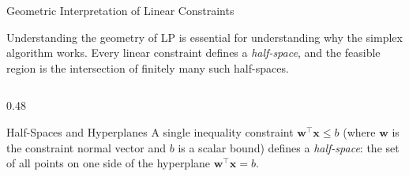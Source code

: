 \documentclass[aspectratio=169,10pt]{beamer}
\newcommand{\xv}{\mathbf{x}}
\newcommand{\wv}{\mathbf{w}}
\begin{document}
\begin{frame}[allowframebreaks]{Geometric Interpretation of Linear Constraints}

Understanding the geometry of LP is essential for understanding why the simplex
algorithm works.  Every linear constraint defines a \emph{half-space}, and the
feasible region is the intersection of finitely many such half-spaces.

\begin{columns}
  \begin{column}{0.48\textwidth}
    \begin{block}{Half-Spaces and Hyperplanes}
      A single inequality constraint $\wv^\top\xv \le b$ (where $\wv$ is the
      constraint normal vector and $b$ is a scalar bound) defines a
      \emph{half-space}: the set of all points on one side of the
      hyperplane $\wv^\top\xv = b$.


\end{block}
\end{column}
\end{columns}
\end{frame}
\end{document}

